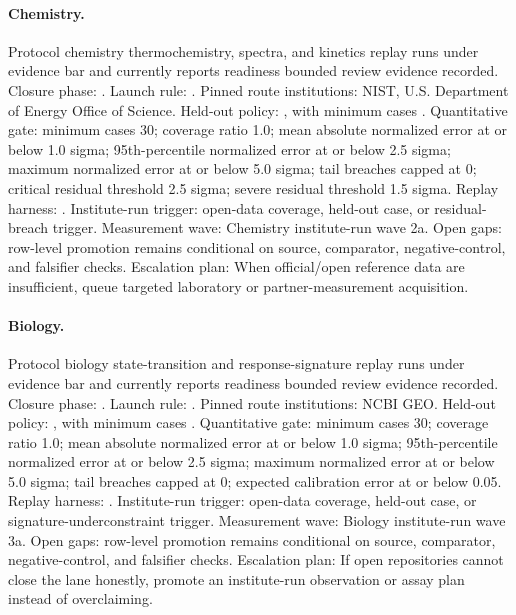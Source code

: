 \paragraph{Chemistry.}
Protocol chemistry thermochemistry, spectra, and kinetics replay runs under evidence bar  and currently reports readiness bounded review evidence recorded.
Closure phase: . Launch rule: .
Pinned route institutions: NIST, \allowbreak U.S. Department of Energy Office of Science.
Held-out policy: , with minimum cases .
Quantitative gate: minimum cases 30; coverage ratio 1.0; mean absolute normalized error at or below 1.0 sigma; 95th-percentile normalized error at or below 2.5 sigma; maximum normalized error at or below 5.0 sigma; tail breaches capped at 0; critical residual threshold 2.5 sigma; severe residual threshold 1.5 sigma.
Replay harness: .
Institute-run trigger: open-data coverage, held-out case, or residual-breach trigger. Measurement wave: Chemistry institute-run wave 2a.
Open gaps: row-level promotion remains conditional on source, comparator, negative-control, and falsifier checks.
Escalation plan: When official/open reference data are insufficient, queue targeted laboratory or partner-measurement acquisition.

\paragraph{Biology.}
Protocol biology state-transition and response-signature replay runs under evidence bar  and currently reports readiness bounded review evidence recorded.
Closure phase: . Launch rule: .
Pinned route institutions: NCBI GEO.
Held-out policy: , with minimum cases .
Quantitative gate: minimum cases 30; coverage ratio 1.0; mean absolute normalized error at or below 1.0 sigma; 95th-percentile normalized error at or below 2.5 sigma; maximum normalized error at or below 5.0 sigma; tail breaches capped at 0; expected calibration error at or below 0.05.
Replay harness: .
Institute-run trigger: open-data coverage, held-out case, or signature-underconstraint trigger. Measurement wave: Biology institute-run wave 3a.
Open gaps: row-level promotion remains conditional on source, comparator, negative-control, and falsifier checks.
Escalation plan: If open repositories cannot close the lane honestly, promote an institute-run observation or assay plan instead of overclaiming.


